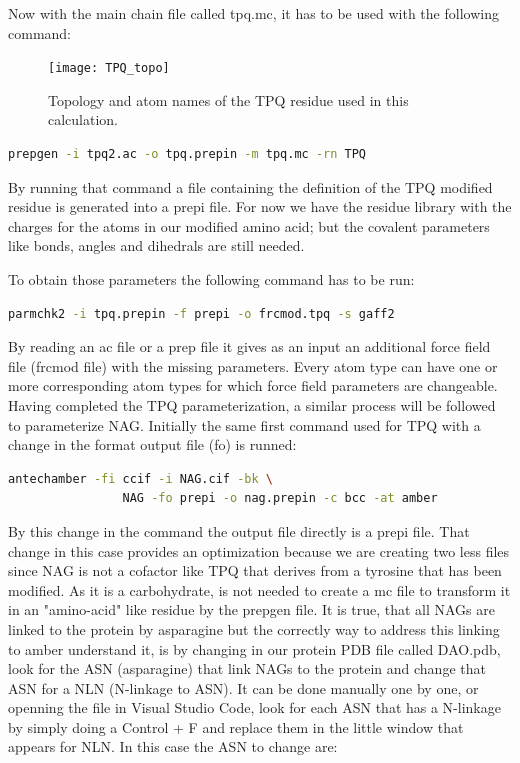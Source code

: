 \documentclass[a4paper]{article}
\begin{document}
Now with the main chain file called tpq.mc, it has to be used with the following command:
\begin{figure}[htbp]
    \centering
    \texttt{[image: TPQ\_topo]}
    \caption{Topology and atom names of the TPQ residue used in this calculation.}
    \label{fig:TPQ_topo}
\end{figure}
\begin{lstlisting}[language=Bash,caption={Prepgen command for TPQ}]
    prepgen -i tpq2.ac -o tpq.prepin -m tpq.mc -rn TPQ
\end{lstlisting}

By running that command a file containing the definition of the TPQ modified residue is generated into a prepi file. For now we have the residue library with the charges for the atoms in our modified amino acid; but the covalent parameters like bonds, angles and dihedrals are still needed.

To obtain those parameters the following command has to be run:

\begin{lstlisting}[language=Bash,caption={Parmchk2 command}]
    parmchk2 -i tpq.prepin -f prepi -o frcmod.tpq -s gaff2
\end{lstlisting}

By reading an ac file or a prep file it gives as an input an additional force field file (frcmod file) with the missing parameters. Every atom type can have one or more corresponding atom types for which force field parameters are changeable.
Having completed the TPQ parameterization, a similar process will be followed to parameterize NAG.
Initially the same first command used for TPQ with a change in the format output file (fo) is runned:

\begin{lstlisting}[language=Bash,caption={Antechamber for NAG}]
    antechamber -fi ccif -i NAG.cif -bk \
                NAG -fo prepi -o nag.prepin -c bcc -at amber
\end{lstlisting}

By this change in the command the output file directly is a prepi file. That change in this case provides an optimization because we are creating two less files since NAG is not a cofactor like TPQ that derives from a tyrosine that has been modified. As it is a carbohydrate, is not needed to create a mc file to transform it in an "amino-acid" like residue by the prepgen file. It is true, that all NAGs are linked to the protein by asparagine but the correctly way to address this linking to amber understand it, is by changing in our protein PDB file called DAO.pdb, look for the ASN (asparagine) that link NAGs to the protein and change that ASN for a NLN (N-linkage to ASN). It can be done manually one by one, or openning the file in Visual Studio Code, look for each ASN that has a N-linkage by simply doing a Control + F and replace them in the little window that appears for NLN. In this case the ASN to change are:
\end{document}
